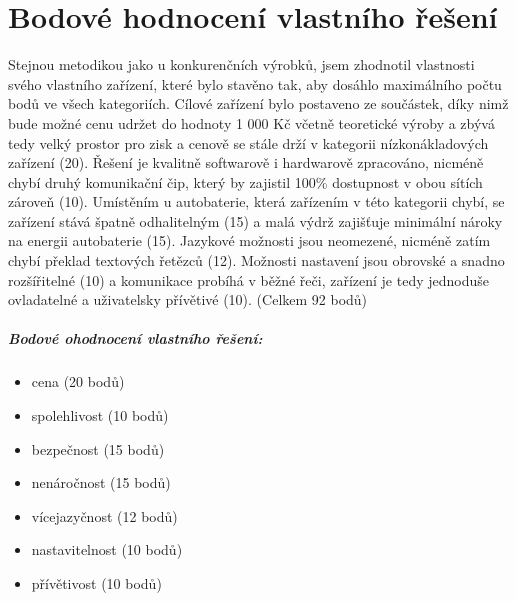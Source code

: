 \documentclass[FM,MP]{tulthesis}  %
\begin{document}

\chapter{Bodové hodnocení vlastního řešení}
Stejnou metodikou jako u konkurenčních výrobků, jsem zhodnotil vlastnosti svého vlastního zařízení, které bylo stavěno tak, aby dosáhlo maximálního počtu bodů ve všech kategoriích. Cílové zařízení bylo postaveno ze součástek, díky nimž bude možné cenu udržet do hodnoty 1 000 Kč včetně teoretické výroby a zbývá tedy velký prostor pro zisk a cenově se stále drží v kategorii nízkonákladových zařízení (20). Řešení je kvalitně softwarově i hardwarově zpracováno, nicméně chybí druhý komunikační čip, který by zajistil 100\% dostupnost v obou sítích zároveň (10). Umístěním u autobaterie, která zařízením v této kategorii chybí, se zařízení stává špatně odhalitelným (15) a malá výdrž zajišťuje minimální nároky na energii autobaterie (15). Jazykové možnosti jsou neomezené, nicméně zatím chybí překlad textových řetězců (12). Možnosti nastavení jsou obrovské a snadno rozšířitelné (10) a komunikace probíhá v běžné řeči, zařízení je tedy jednoduše ovladatelné a uživatelsky přívětivé (10). (Celkem 92 bodů)

\paragraph{Bodové ohodnocení vlastního řešení:}
\begin{itemize}
\item cena (20 bodů)
\item spolehlivost (10 bodů)
\item bezpečnost (15 bodů)
\item nenáročnost (15 bodů)
\item vícejazyčnost (12 bodů)
\item nastavitelnost (10 bodů)
\item přívětivost (10 bodů)
\end{itemize}
\end{document}
